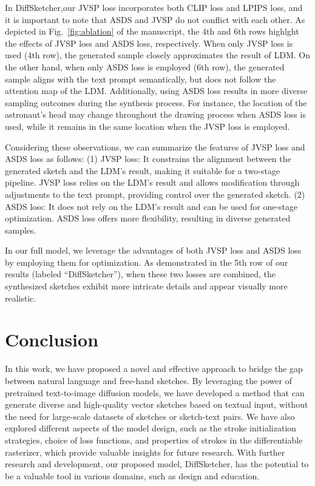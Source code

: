 \documentclass{article}
\begin{document}
In DiffSketcher,our JVSP loss incorporates both CLIP loss and LPIPS loss, and it is important to note that ASDS and JVSP do not conflict with each other. As depicted in Fig.~\ref{fig:ablation} of the manuscript, the 4th and 6th rows highlght the effects of JVSP loss and ASDS loss, respectively. When only JVSP loss is used (4th row), the generated sample closely approximates the result of LDM. On the other hand, when only ASDS loss is employed (6th row), the generated sample aligns with the text prompt semantically, but does not follow the attention map of the LDM. Additionally, using ASDS loss results in more diverse sampling outcomes during the synthesis process. For instance, the location of the astronaut's head may change throughout the drawing process when ASDS loss is used, while it remains in the same location when the JVSP loss is employed.

Considering these observations, we can summarize the features of JVSP loss and ASDS loss as follows: (1) JVSP loss: It constrains the alignment between the generated sketch and the LDM's result, making it suitable for a two-stage pipeline. JVSP loss relies on the LDM's result and allows modification through adjustments to the text prompt, providing control over the generated sketch. (2) ASDS loss: It does not rely on the LDM's result and can be used for one-stage optimization. ASDS loss offers more flexibility, resulting in diverse generated samples. 

In our full model, we leverage the advantages of both JVSP loss and ASDS loss by employing them for optimization. As demonstrated in the 5th row of our results (labeled ``DiffSketcher''), when these two losses are combined, the synthesized sketches exhibit more intricate details and appear visually more realistic.

\section{Conclusion}
In this work, we have proposed a novel and effective approach to bridge the gap between natural language and free-hand sketches. By leveraging the power of pretrained text-to-image diffusion models, we have developed a method that can generate diverse and high-quality vector sketches based on textual input, without the need for large-scale datasets of sketches or sketch-text pairs.
We have also explored different aspects of the model design, such as the stroke initialization strategies, choice of loss functions, and properties of strokes in the differentiable rasterizer, which provide valuable insights for future research.
With further research and development, our proposed model, DiffSketcher, has the potential to be a valuable tool in various domains, such as design and education.

\medskip

\newpage
\clearpage




\end{document}
